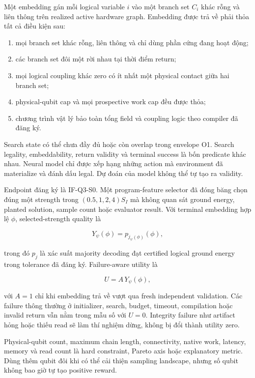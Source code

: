 \documentclass[
  vietnamese,
  10pt,
  a4paper,
]{article}
\providecommand{\tightlist}{%
  \setlength{\itemsep}{0pt}\setlength{\parskip}{0pt}}
\begin{document}
Một embedding gán mỗi logical variable \(i\) vào một branch set \(C_i\)
khác rỗng và liên thông trên realized active hardware graph. Embedding
được trả về phải thỏa tất cả điều kiện sau:

\begin{enumerate}
\def\labelenumi{\arabic{enumi}.}
\tightlist
\item
  mọi branch set khác rỗng, liên thông và chỉ dùng phần cứng đang hoạt
  động;
\item
  các branch set đôi một rời nhau tại thời điểm return;
\item
  mọi logical coupling khác zero có ít nhất một physical contact giữa
  hai branch set;
\item
  physical-qubit cap và mọi prospective work cap đều được thỏa;
\item
  chương trình vật lý bảo toàn tổng field và coupling logic theo
  compiler đã đăng ký.
\end{enumerate}

Search state có thể chưa đầy đủ hoặc còn overlap trong envelope O1.
Search legality, embeddability, return validity và terminal success là
bốn predicate khác nhau. Neural model chỉ được xếp hạng những action mà
environment đã materialize và đánh dấu legal. Dự đoán của model không
thể tự tạo ra validity.

Endpoint đăng ký là IF-Q3-S0. Một program-feature selector đã đóng băng
chọn đúng một strength trong \((0.5,1,2,4)S_I\) mà không quan sát ground
energy, planted solution, sample count hoặc evaluator result. Với
terminal embedding hợp lệ \(\phi\), selected-strength quality là

\[
Y_\psi(\phi)=p_{j_\psi(\phi)}(\phi),
\]

trong đó \(p_j\) là xác suất majority decoding đạt certified logical
ground energy trong tolerance đã đăng ký. Failure-aware utility là

\[
U=A\,Y_\psi(\phi),
\]

với \(A=1\) chỉ khi embedding trả về vượt qua fresh independent
validation. Các failure thông thường ở initializer, search, budget,
timeout, compilation hoặc invalid return vẫn nằm trong mẫu số với
\(U=0\). Integrity failure như artifact hỏng hoặc thiếu read sẽ làm thí
nghiệm dừng, không bị đổi thành utility zero.

Physical-qubit count, maximum chain length, connectivity, native work,
latency, memory và read count là hard constraint, Pareto axis hoặc
explanatory metric. Dùng thêm qubit đôi khi có thể cải thiện sampling
landscape, nhưng số qubit không bao giờ tự tạo positive reward.
\end{document}
